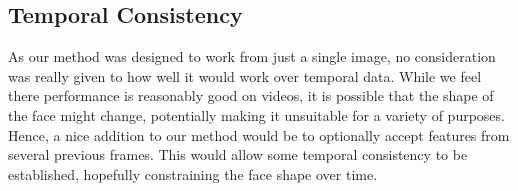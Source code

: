 \subsection{Temporal Consistency}

As our method was designed to work from just a single image, no
consideration was really given to how well it would work over temporal
data. While we feel there performance is reasonably good on videos, it
is possible that the shape of the face might change, potentially
making it unsuitable for a variety of purposes. Hence, a nice addition
to our method would be to optionally accept features from several
previous frames. This would allow some temporal consistency to be
established, hopefully constraining the face shape over time.


